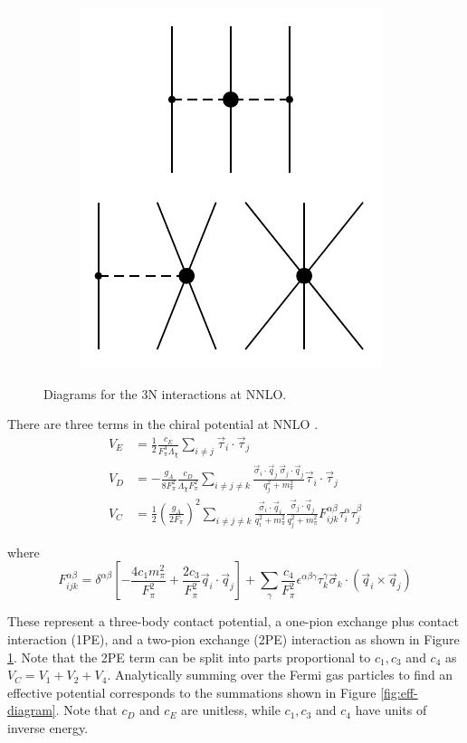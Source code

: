 \documentclass[%
 preprint,
 amsmath,amssymb,
 aps,
]{revtex4-1}
\begin{document}
\begin{figure}
\begin{subfigure}{0.25\textwidth}
\includegraphics[page=2]{Figures/3NFDiagrams}
\end{subfigure}
\caption{\label{fig:3NF}Diagrams for the 3N interactions at NNLO.}
\end{figure}

There are three terms in the chiral potential at NNLO \cite{PhysRevC.66.064001}. 
\begin{align}
V_E&=\frac{1}{2}\frac{c_E }{F_\pi^4\Lambda_\chi}\sum_{i\neq j} \vec{\tau}_i\cdot\vec{\tau}_j \label{eq:V_E} \\
V_D&=-\frac{ g_A}{8F_\pi^2}\frac{c_D}{\Lambda_\chi F_\pi^2}\sum_{i\neq j \neq k} \frac{ \vec{\sigma}_i\cdot\vec{q}_j\:\vec{\sigma}_j\cdot\vec{q}_j }{q^2_j+m_\pi^2} \vec{\tau}_i\cdot\vec{\tau}_j \label{eq:V_D}\\
V_{C} &= \frac{1}{2}\left(\frac{g_A}{2F_\pi}\right)^2\sum_{i\neq j \neq k} \frac{ \vec{\sigma}_i\cdot\vec{q}_i}{q_i^2+m_\pi^2}\frac{\vec{\sigma}_j\cdot\vec{q}_j }{q^2_j+m_\pi^2} F_{ijk}^{\alpha\beta}\tau_i^{\alpha}\tau_j^\beta \label{eq:V_c}
\end{align}

where 
\begin{equation}
F_{ijk}^{\alpha\beta}=\delta^{\alpha \beta}\left[-\frac{4c_1m_\pi^2}{F_\pi^2}+\frac{2c_3}{F_\pi^2}\vec{q}_i\cdot\vec{q}_j\right]+\sum_\gamma\frac{c_4}{F_\pi^2}\epsilon^{\alpha\beta\gamma}\tau^\gamma_k\vec{\sigma}_k\cdot\left(\vec{q}_i\times\vec{q}_j\right)
\end{equation}

These represent a three-body contact potential, a one-pion exchange plus contact interaction (1PE), and a two-pion exchange (2PE) interaction as shown in Figure \ref{fig:3NF}. Note that the 2PE term can be split into parts proportional to $c_1, c_3$ and $c_4$ as $V_C=V_1+V_2+V_4$. Analytically summing over the Fermi gas particles to find an effective potential corresponds to the summations shown in Figure \ref{fig:eff-diagram}. Note that $c_D$ and $c_E$ are unitless, while $c_1, c_3$ and $c_4$ have units of inverse energy.
\end{document}
